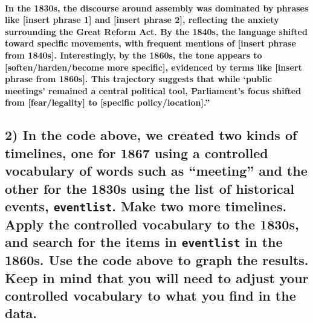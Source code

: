 \documentclass[
]{article}
\begin{document}
\paragraph{In the 1830s, the discourse around assembly was dominated by
phrases like {[}insert phrase 1{]} and {[}insert phrase 2{]}, reflecting
the anxiety surrounding the Great Reform Act. By the 1840s, the language
shifted toward specific movements, with frequent mentions of {[}insert
phrase from 1840s{]}. Interestingly, by the 1860s, the tone appears to
{[}soften/harden/become more specific{]}, evidenced by terms like
{[}insert phrase from 1860s{]}. This trajectory suggests that while
`public meetings' remained a central political tool, Parliament's focus
shifted from {[}fear/legality{]} to {[}specific
policy/location{]}.''}\label{in-the-1830s-the-discourse-around-assembly-was-dominated-by-phrases-like-insert-phrase-1-and-insert-phrase-2-reflecting-the-anxiety-surrounding-the-great-reform-act.-by-the-1840s-the-language-shifted-toward-specific-movements-with-frequent-mentions-of-insert-phrase-from-1840s.-interestingly-by-the-1860s-the-tone-appears-to-softenhardenbecome-more-specific-evidenced-by-terms-like-insert-phrase-from-1860s.-this-trajectory-suggests-that-while-public-meetings-remained-a-central-political-tool-parliaments-focus-shifted-from-fearlegality-to-specific-policylocation.}

\subsection{\texorpdfstring{2) In the code above, we created two kinds
of timelines, one for 1867 using a controlled vocabulary of words such
as ``meeting'' and the other for the 1830s using the list of historical
events, \texttt{eventlist}. Make two more timelines. Apply the
controlled vocabulary to the 1830s, and search for the items in
\texttt{eventlist} in the 1860s. Use the code above to graph the
results. Keep in mind that you will need to adjust your controlled
vocabulary to what you find in the
data.}{2) In the code above, we created two kinds of timelines, one for 1867 using a controlled vocabulary of words such as ``meeting'' and the other for the 1830s using the list of historical events, eventlist. Make two more timelines. Apply the controlled vocabulary to the 1830s, and search for the items in eventlist in the 1860s. Use the code above to graph the results. Keep in mind that you will need to adjust your controlled vocabulary to what you find in the data.}}\label{in-the-code-above-we-created-two-kinds-of-timelines-one-for-1867-using-a-controlled-vocabulary-of-words-such-as-meeting-and-the-other-for-the-1830s-using-the-list-of-historical-events-eventlist.-make-two-more-timelines.-apply-the-controlled-vocabulary-to-the-1830s-and-search-for-the-items-in-eventlist-in-the-1860s.-use-the-code-above-to-graph-the-results.-keep-in-mind-that-you-will-need-to-adjust-your-controlled-vocabulary-to-what-you-find-in-the-data.}
\end{document}
